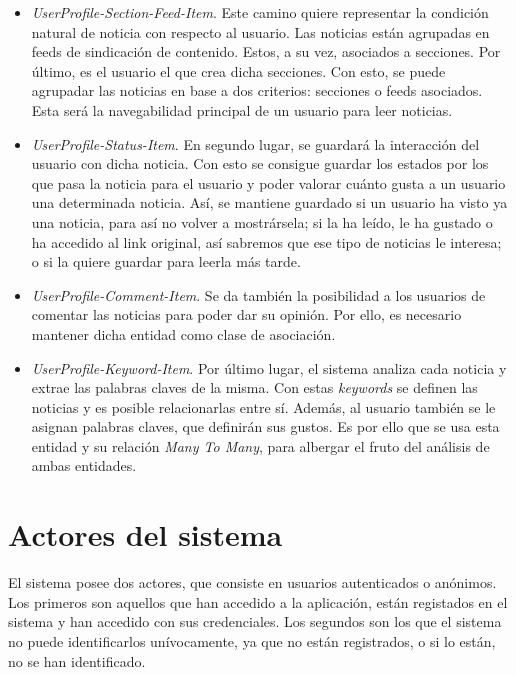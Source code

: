 \begin{itemize}
    \item \textit{UserProfile-Section-Feed-Item}. Este camino quiere representar la condición natural de noticia con respecto al usuario. Las noticias están agrupadas en feeds de sindicación de contenido. Estos, a su vez, asociados a secciones. Por último, es el usuario el que crea dicha secciones. Con esto, se puede agrupadar las noticias en base a dos criterios: secciones o feeds asociados. Esta será la navegabilidad principal de un usuario para leer noticias.
    \item \textit{UserProfile-Status-Item}. En segundo lugar, se guardará la interacción del usuario con dicha noticia. Con esto se consigue guardar los estados por los que pasa la noticia para el usuario y poder valorar cuánto gusta a un usuario una determinada noticia. Así, se mantiene guardado si un usuario ha visto ya una noticia, para así no volver a mostrársela; si la ha leído, le ha gustado o ha accedido al link original, así sabremos que ese tipo de noticias le interesa; o si la quiere guardar para leerla más tarde.
    \item \textit{UserProfile-Comment-Item}. Se da también la posibilidad a los usuarios de comentar las noticias para poder dar su opinión. Por ello, es necesario mantener dicha entidad como clase de asociación.
    \item \textit{UserProfile-Keyword-Item}. Por último lugar, el sistema analiza cada noticia y extrae las palabras claves de la misma. Con estas \textit{keywords} se definen las noticias y es posible relacionarlas entre sí. Además, al usuario también se le asignan palabras claves, que definirán sus gustos. Es por ello que se usa esta entidad y su relación \textit{Many To Many}, para albergar el fruto del análisis de ambas entidades.
\end{itemize}


\section{Actores del sistema}\label{sec:actores del sistema}

El sistema posee dos actores, que consiste en usuarios autenticados o anónimos. Los primeros son aquellos que han accedido a la aplicación, están registados en el sistema y han accedido con sus credenciales. Los segundos son los que el sistema no puede identificarlos unívocamente, ya que no están registrados, o si lo están, no se han identificado.

